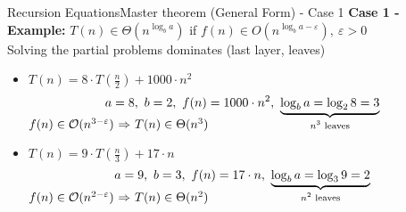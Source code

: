 \begin{frame}{Recursion Equations}{Master theorem (General Form) - Case 1}
  \textbf{Case 1 - Example:}
  {\color{Mittel-Gruen}$T(n) \in \Theta(n^{\log_b a})$}
  \hfill if {\color{Mittel-Blau}
    $f(n) \in O(n^{\log_b a-\varepsilon}), ~ \varepsilon > 0$
   }\\
   {\color{gray}Solving the partial problems dominates (last layer, leaves)}
   \vspace{1.0em}
   \begin{itemize}
     \item<3->
       $T(n) = 8 \cdot T(\tfrac{n}{2}) + 1000 \cdot n^2$
       \vspace{-0.5em}
       \begin{displaymath}
         a = 8, ~ b = 2, ~ f(n) = 1000 \cdot n^2, ~
         \smash{\underbrace{
           \log_b a = \log_2 8 = 3
         }_{\text{$n^3$ leaves}}}
       \end{displaymath}
       {\color{Mittel-Blau}\begin{math}
          f(n) \in \mathcal{O}(n^{3-\varepsilon})$
          $\Rightarrow$
          $T(n) \in \Theta(n^3)
       \end{math}}
      \vspace{1.5em}
    \item<4->
      $T(n) = 9 \cdot T(\tfrac{n}{3}) + 17 \cdot n$
      \vspace{-0.5em}
      \begin{displaymath}
        a = 9, ~ b = 3, ~ f(n) = 17 \cdot n, ~
        \smash{\underbrace{
          \log_b a = \log_3 9 = 2
        }_{\text{$n^2$ leaves}}}
      \end{displaymath}
      {\color{Mittel-Blau}\begin{math}
        f(n) \in \mathcal{O}(n^{2-\varepsilon})$
        $\Rightarrow$
        $T(n) \in \Theta(n^2)
      \end{math}}
   \end{itemize}
\end{frame}


